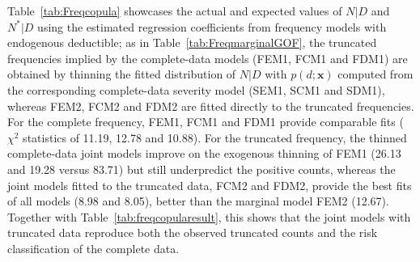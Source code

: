 \documentclass[11pt]{article}
\newcommand{\rev}[1]{{\color{blue}#1}}
\begin{document}
Table~\ref{tab:Freqcopula} showcases the actual and expected values of $N|D$ and $N^*|D$ using the estimated regression
coefficients from frequency models with endogenous deductible\rev{; as in Table~\ref{tab:FreqmarginalGOF}, the truncated frequencies implied by the complete-data models (FEM1, FCM1 and FDM1) are obtained by thinning the fitted distribution of $N|D$ with $p(d;\bm{x})$ computed from the corresponding complete-data severity model (SEM1, SCM1 and SDM1), whereas FEM2, FCM2 and FDM2 are fitted directly to the truncated frequencies. For the complete frequency, FEM1, FCM1 and FDM1 provide comparable fits ($\chi^2$ statistics of 11.19, 12.78 and 10.88). For the truncated frequency, the thinned complete-data joint models improve on the exogenous thinning of FEM1 (26.13 and 19.28 versus 83.71) but still underpredict the positive counts, whereas the joint models fitted to the truncated data, FCM2 and FDM2, provide the best fits of all models (8.98 and 8.05), better than the marginal model FEM2 (12.67). Together with Table~\ref{tab:freqcopularesult}, this shows that the joint models with truncated data reproduce both the observed truncated counts and the risk classification of the complete data.}
\end{document}
